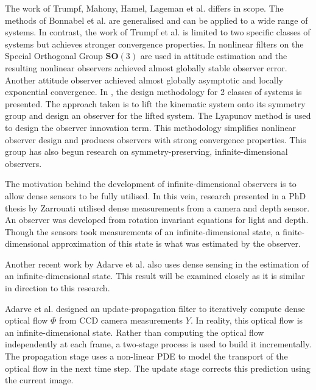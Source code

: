 The work of Trumpf, Mahony, Hamel, Lageman et al. differs in scope. The methods of Bonnabel et al. are generalised and can be applied to a wide range of systems. In contrast, the work of Trumpf et al. is limited to two specific classes of systems but achieves stronger convergence properties.
In \cite{mahony2009nonlinear} nonlinear filters on the Special Orthogonal Group $\mathbf{SO}(3)$ are used in attitude estimation and the resulting nonlinear observers achieved almost globally stable observer error.
Another attitude observer \cite{trumpf2012analysis} achieved almost globally asymptotic and locally exponential convergence.
In \cite{mahony2013observers}, the design methodology for 2 classes of systems is presented. The approach taken is to lift the kinematic system onto its symmetry group and design an observer for the lifted system. The Lyapunov method is used to design the observer innovation term. This methodology simplifies nonlinear observer design and produces observers with strong convergence properties. This group has also begun research  on symmetry-preserving, infinite-dimensional observers.

The motivation behind the development of infinite-dimensional observers is to allow dense sensors to be fully utilised. In this vein, research presented in a PhD thesis by Zarrouati \cite{zarrouati2013augmented} utilised dense measurements from a camera and depth sensor. An observer was developed from rotation invariant equations for light and depth. Though the sensors took measurements of an infinite-dimensional state, a finite-dimensional approximation of this state is what was estimated by the observer.

Another recent work by Adarve et al.\cite{adarvefiltering} also uses dense sensing in the estimation of an infinite-dimensional state. This result will be examined closely as it is similar in direction to this research.

Adarve et al. designed an update-propagation filter to iteratively compute dense optical flow $\Phi$ from CCD camera measurements $Y$. In reality, this optical flow is an infinite-dimensional state. Rather than computing the optical flow independently at each frame, a two-stage process is used to build it incrementally. The propagation stage uses a non-linear PDE to model the transport of the optical flow in the next time step. The update stage corrects this prediction using the current image.

